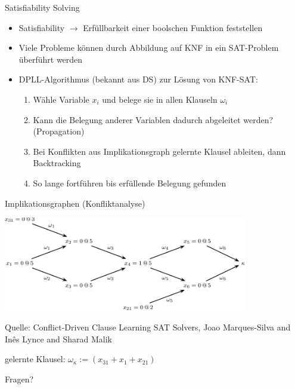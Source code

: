 \documentclass[
  german,            %
  aspectratio=169,    %
]{tumbeamer}
\begin{document}
\begin{frame}[fragile, c]{Satisfiability Solving}{}
  \begin{itemize}
    \item Satisfiability $\rightarrow$ Erfüllbarkeit einer boolschen Funktion feststellen
    \item Viele Probleme können durch Abbildung auf KNF in ein SAT-Problem überführt werden
    \item DPLL-Algorithmus (bekannt aus DS) zur Lösung von KNF-SAT:
          \begin{enumerate}
            \item Wähle Variable $x_i$ und belege sie in allen Klauseln $\omega_i$
            \item Kann die Belegung anderer Variablen dadurch abgeleitet werden? (Propagation)
            \item Bei Konflikten aus Implikationsgraph \glqq gelernte Klausel\grqq\; ableiten, dann Backtracking
            \item So lange fortführen bis erfüllende Belegung gefunden
          \end{enumerate}
  \end{itemize}
\end{frame}


\begin{frame}[c, fragile]{Implikationsgraphen (Konfliktanalyse)}{}

  \begin{center}
    \includegraphics[width=0.8\textwidth]{w12_sat.png}
  \end{center}
  \begin{center}
    \tiny{Quelle: Conflict-Driven Clause Learning SAT Solvers, Joao Marques-Silva and In{\^e}s Lynce and Sharad Malik}
  \end{center}
  gelernte Klausel: $\omega_\kappa:=(x_{31} + x_1 + x_{21})$
\end{frame}

\begin{frame}[c]{}{}
  \begin{center}
    \LARGE Fragen?
  \end{center}
\end{frame}
\end{document}
